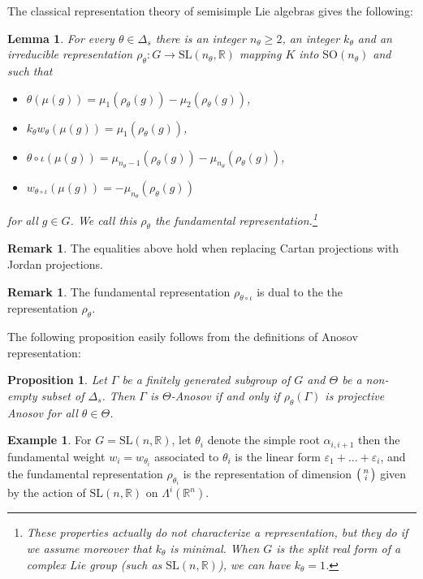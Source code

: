 \documentclass[JEP,XML,SOM,Unicode,NoEqCountersInSection,NoFloatCountersInSection,published]{cedram}
\newenvironment{smallpmatrix}{\big(\begin{smallmatrix}}{\end{smallmatrix}\big)}
\newtheorem{lemma}[theo]{Lemma}
\newtheorem{prop}[theo]{Proposition}
\theoremstyle{definition}
\newtheorem{example}[theo]{Example}
\newtheorem{rmk}[theo]{Remark}
\newcommand{\R}{\mathbb{R}}
\newcommand{\SL}{\mathrm{SL}}
\newcommand{\SO}{\mathrm{SO}}
\let\epsilon\varepsilon
\let\op\iota
\begin{document}
The classical representation theory of semisimple Lie algebras gives the following:
\begin{lemma}
For every $\theta \in \Delta_s$ there is an integer $n_\theta \geq 2$, an integer $k_\theta$ and an irreducible representation $\rho_\theta: G\to \SL(n_\theta,\R)$ mapping $K$ into $\SO(n_\theta)$ and such that
\begin{itemize}
\item $\theta(\mu(g))= \mu_1(\rho_\theta(g)) - \mu_2(\rho_\theta(g))$,
\item $k_\theta w_\theta(\mu(g)) = \mu_1(\rho_\theta(g))$,
\item $\theta\circ \op(\mu(g))= \mu_{n_\theta-1}(\rho_\theta(g)) - \mu_{n_\theta}(\rho_\theta(g))$,
\item $w_{\theta\circ \op}(\mu(g)) = -\mu_{n_\theta}(\rho_\theta(g))$
\end{itemize}
for all $g\in G$. We call this $\rho_\theta$ the \emph{fundamental representation}.\footnote{These properties actually do not characterize a representation, but they do if we assume moreover that $k_\theta$ is minimal. When $G$ is the split real form of a complex Lie group (such as $\SL(n,\R)$), we can have $k_\theta= 1$.}
\end{lemma}

\begin{rmk}
The equalities above hold when replacing Cartan projections with Jordan projections.
\end{rmk}

\begin{rmk}
The fundamental representation $\rho_{\theta\circ \iota}$ is dual to the the representation $\rho_\theta$.
\end{rmk}

The following proposition easily follows from the definitions of Anosov representation:

\begin{prop}
Let $\Gamma$ be a finitely generated subgroup of $G$ and $\Theta$ be a non-empty subset of $\Delta_s$. Then $\Gamma$ is $\Theta$-Anosov if and only if $\rho_\theta(\Gamma)$ is projective Anosov for all $\theta \in \Theta$.
\end{prop}

\begin{example}
For $G= \SL(n,\R)$, let $\theta_i$ denote the simple root $\alpha_{i,i+1}$ then the fundamental weight $w_i = w_{\theta_i}$ associated to $\theta_i$ is the linear form $\epsilon_1+\ldots + \epsilon_i$, and the fundamental representation $\rho_{\theta_i}$ is the representation of dimension $\begin{smallpmatrix} n \\ i \end{smallpmatrix}$ given by the action of $\SL(n,\R)$ on $\Lambda^i(\R^n)$.
\end{example}
\end{document}
